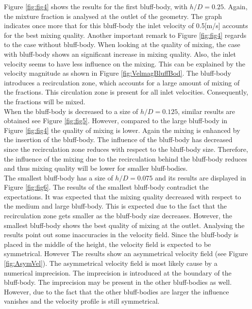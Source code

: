 \documentclass{CFD2017}
\begin{document}
Figure \ref{fig:fig4} shows the results for the first bluff-body, with $h/D=0.25 $. Again, the mixture fraction is analysed at the outlet of the geometry. The graph indicates once more that for this bluff-body the inlet velocity  of 0.5[m/s] accounts for the best mixing quality. Another important remark to Figure \ref{fig:fig4} regards to the case without bluff-body. When looking at the quality of mixing, the case with bluff-body shows an significant increase in mixing quality. Also, the inlet velocity seems to have less influence on the mixing. This can be explained by the velocity magnitude as shown in Figure \ref{fig:VelmagBluffBod}. The bluff-body introduces a recirculation zone, which accounts for a large amount of mixing of the fractions. This circulation zone is present for all inlet velocities. Consequently, the fractions will be mixed.\\
When the bluff-body is decreased to a size of $h/D=0.125$, similar results are obtained see Figure \ref{fig:fig5}. However, compared to the large bluff-body in Figure \ref{fig:fig4} the quality of mixing is lower. Again the mixing is enhanced by the insertion of the bluff-body. The influence of the bluff-body has decreased since the recirculation zone reduces with respect to the bluff-body size. Therefore, the influence of the mixing due to the recirculation behind the bluff-body reduces and thus mixing quality will be lower for smaller bluff-bodies.\\
The smallest bluff-body has a size of $h/D=0.075$ and its results are displayed in Figure \ref{fig:fig6}. The results of the smallest bluff-body contradict the expectations. It was expected that the mixing quality decreased with respect to the medium and large bluff-body. This is expected due to the fact that the recirculation zone gets smaller as the bluff-body size decreases. However, the smallest bluff-body shows the best quality of mixing at the outlet. Analysing the results point out some inaccuracies in the velocity field. Since the bluff-body is placed in the middle of the height, the velocity field is expected to be symmetrical. However The results show an asymmetrical velocity field (see Figure \ref{fig:AsymVel}). The asymmetrical velocity field is most likely cause by a numerical imprecision. The imprecision is introduced at the boundary of the bluff-body. The imprecision may be present in the other bluff-bodies as well. However, due to the fact that the other bluff-bodies are larger the influence vanishes and the velocity profile is still symmetrical.\\
\end{document}
